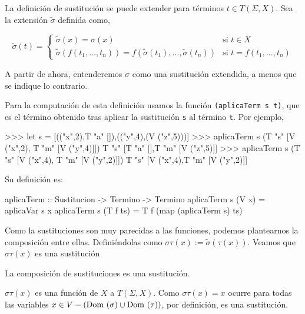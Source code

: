 La definición de sustitución se puede extender para términos
$t \in T(\Sigma, X)$. Sea la extensión $\tilde{\sigma}$ definida como,

\begin{equation*}
  \tilde{\sigma}(t)=
  \left\lbrace
    \begin{array}{ll}
      \tilde{\sigma}(x) = \sigma(x) 
        & \text{si } t \in X \\
      \tilde{\sigma}(f(t_1, \dots, t_n)) = f(\tilde{\sigma}(t_1), \dots, \tilde{\sigma}(t_n)) 
        & \text{si } t = f(t_1, \dots, t_n)
    \end{array}
  \right.
\end{equation*}

A partir de ahora, entenderemos $\sigma$ como una sustitución
extendida, a menos que se indique lo contrario.

Para la computación de esta definición usamos la función
\texttt{(aplicaTerm s t)}, que es el término obtenido tras aplicar la
sustitución \texttt{s} al término \texttt{t}. Por ejemplo,

\begin{sesion}
>>> let s = [(("x",2),T "a" []),(("y",4),(V ("z",5)))]
>>> aplicaTerm s (T "s" [V ("x",2), T "m" [V ("y",4)]])
T "s" [T "a" [],T "m" [V ("z",5)]]
>>> aplicaTerm s (T "s" [V ("x",4), T "m" [V ("y",2)]])
T "s" [V ("x",4),T "m" [V ("y",2)]]
\end{sesion}

Su definición es:

\begin{codigo}
aplicaTerm :: Sustitucion -> Termino -> Termino
aplicaTerm s (V x)    = aplicaVar s x
aplicaTerm s (T f ts) = T f (map (aplicaTerm s) ts)
\end{codigo}

Como la sustituciones son muy parecidas a las funciones, podemos
plantearnos la composición entre ellas. Definiéndolas como $\sigma\tau(x) :=
\tilde{\sigma}(\tau(x))$. Veamos que $\sigma\tau(x)$ es una sustitución

\begin{lema}
  La composición de sustituciones es una sustitución.
\end{lema}

\begin{demo}
  $\sigma\tau(x)$ es una función de $X$ a $T(\Sigma, X)$. Como
  $\sigma\tau(x) = x$ ocurre para todas las variables
  $x\in V - (\mbox{Dom }(\sigma)\cup \mbox{Dom }(\tau))$, por definición, es una
  sustitución.
\end{demo}

